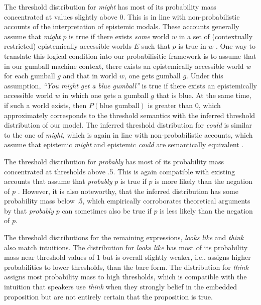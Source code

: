 \documentclass[lucida,biblatex]{sp} %
\begin{document}
The threshold distribution for \textit{might} has most of its probability mass concentrated at values slightly above 0. This 
is in line with non-probabilistic accounts of the interpretation of epistemic modals. These accounts generally assume that \textit{might} $p$ is true 
if there exists \textit{some} world $w$ in a set of (contextually restricted) epistemically accessible worlds $E$ such that $p$ is true in $w$ 
\citep[e.g.,][]{Kratzer1991,Swanson2008,Hacquard2012}. One way to translate this logical condition into our probabilisitic framework is to assume that 
in our gumball machine context, there exists an epistemically accessible world $w$ for each gumball $g$ and that in world $w$, one gets gumball $g$. 
Under this assumption, \textit{``You might get a blue gumball''} is true if there exists an epistemically accessible world $w$  in which one gets a
gumball $g$ that is blue. At the same time, if such a world exists, then $P(\mbox{blue gumball})$ is greater than 0, which approximately corresponds
to the threshold semantics with the inferred threshold distribution of our model. The inferred threshold distribution for \textit{could} is similar to the one of \textit{might}, 
which is again in line with non-probabilistic accounts, which assume that epistemic \textit{might} and epistemic \textit{could} are semantically equivalent \citep{Kratzer1991,Hacquard2012}.

The threshold distribution for \textit{probably} has most of its probability mass concentrated at thresholds above .5. This is again compatible with existing accounts that assume 
that \textit{probably} $p$ is true if $p$ is more likely than the negation of $p$ \citep[e.g.,][]{Kratzer1991}. However, it is also noteworthy, that the inferred
distribution has some probability mass below .5, which empirically corroborates theoretical arguments by \citet{Yalcin2010} that \textit{probably} $p$ can
sometimes also be true if $p$ is less likely than the negation of $p$.

The threshold distributions for the remaining expressions, \textit{looks like} and \textit{think} also match intuitions. The distribution for 
\textit{looks like} has most of its probability mass near threshold values of 1 but is overall slightly weaker, i.e., assigns higher probabilities to lower thresholds,
than the bare form. The distribution for \textit{think} assigns most probability mass to high thresholds, which is compatible with the intuition
that speakers use \textit{think} when they strongly belief in the embedded proposition but are not entirely certain that the proposition is true.
 
\end{document}
